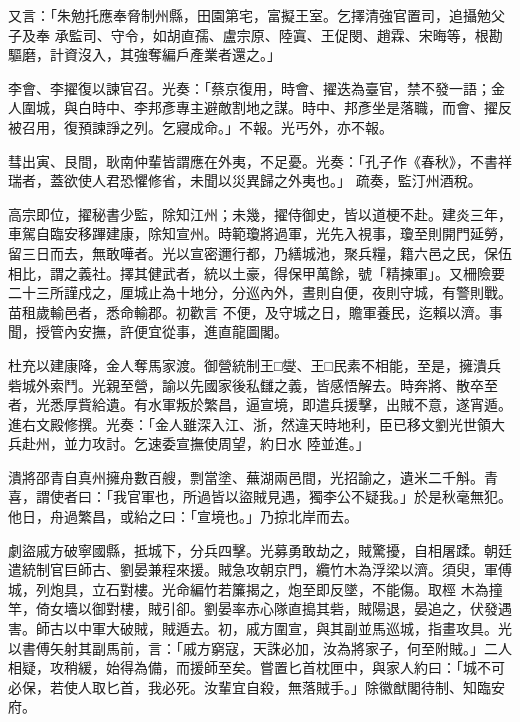 \begin{pinyinscope}
 又言：「朱勉托應奉脅制州縣，田園第宅，富擬王室。乞擇清強官置司，追攝勉父子及奉
 承監司、守令，如胡直孺、盧宗原、陸寘、王促閔、趙霖、宋晦等，根勘驅磨，計資沒入，其強奪編戶產業者還之。」



 李會、李擢復以諫官召。光奏：「蔡京復用，時會、擢迭為臺官，禁不發一語；金人圍城，與白時中、李邦彥專主避敵割地之謀。時中、邦彥坐是落職，而會、擢反被召用，復預諫諍之列。乞寢成命。」不報。光丐外，亦不報。



 彗出寅、艮間，耿南仲輩皆謂應在外夷，不足憂。光奏：「孔子作《春秋》，不書祥瑞者，蓋欲使人君恐懼修省，未聞以災異歸之外夷也。」
 疏奏，監汀州酒稅。



 高宗即位，擢秘書少監，除知江州；未幾，擢侍御史，皆以道梗不赴。建炎三年，車駕自臨安移蹕建康，除知宣州。時範瓊將過軍，光先入視事，瓊至則開門延勞，留三日而去，無敢嘩者。光以宣密邇行都，乃繕城池，聚兵糧，籍六邑之民，保伍相比，謂之義社。擇其健武者，統以土豪，得保甲萬餘，號「精揀軍」。又柵險要二十三所謹戍之，厘城止為十地分，分巡內外，晝則自便，夜則守城，有警則戰。苗租歲輸邑者，悉命輸郡。初歡言
 不便，及守城之日，贍軍養民，迄賴以濟。事聞，授管內安撫，許便宜從事，進直龍圖閣。



 杜充以建康降，金人奪馬家渡。御營統制王□燮、王□民素不相能，至是，擁潰兵砦城外索鬥。光親至營，諭以先國家後私讎之義，皆感悟解去。時奔將、散卒至者，光悉厚貲給遺。有水軍叛於繁昌，逼宣境，即遣兵援擊，出賊不意，遂宵遁。進右文殿修撰。光奏：「金人雖深入江、浙，然違天時地利，臣已移文劉光世領大兵赴州，並力攻討。乞速委宣撫使周望，約日水
 陸並進。」



 潰將邵青自真州擁舟數百艘，剽當塗、蕪湖兩邑間，光招諭之，遺米二千斛。青喜，謂使者曰：「我官軍也，所過皆以盜賊見遇，獨李公不疑我。」於是秋毫無犯。他日，舟過繁昌，或紿之曰：「宣境也。」乃掠北岸而去。



 劇盜戚方破寧國縣，抵城下，分兵四擊。光募勇敢劫之，賊驚擾，自相屠蹂。朝廷遣統制官巨師古、劉晏兼程來援。賊急攻朝京門，纜竹木為浮梁以濟。須臾，軍傅城，列炮具，立石對樓。光命編竹若簾揭之，炮至即反墜，不能傷。取桱
 木為撞竿，倚女墻以御對樓，賊引卻。劉晏率赤心隊直搗其砦，賊陽退，晏追之，伏發遇害。師古以中軍大破賊，賊遁去。初，戚方圍宣，與其副並馬巡城，指畫攻具。光以書傅矢射其副馬前，言：「戚方窮寇，天誅必加，汝為將家子，何至附賊。」二人相疑，攻稍緩，始得為備，而援師至矣。嘗置匕首枕匣中，與家人約曰：「城不可必保，若使人取匕首，我必死。汝輩宜自殺，無落賊手。」除徽猷閣待制、知臨安府。




\end{pinyinscope}
